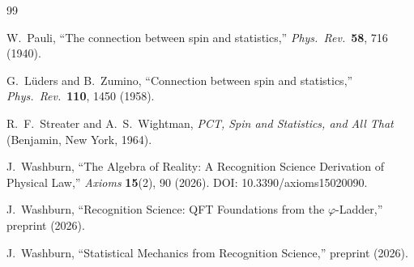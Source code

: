 \documentclass[12pt,a4paper]{article}
\theoremstyle{definition}
\theoremstyle{remark}
\begin{document}
\begin{thebibliography}{99}

W.~Pauli, ``The connection between spin and statistics,''
\textit{Phys.\ Rev.}\ \textbf{58}, 716 (1940).

G.~L\"{u}ders and B.~Zumino, ``Connection between spin and statistics,''
\textit{Phys.\ Rev.}\ \textbf{110}, 1450 (1958).

R.~F.~Streater and A.~S.~Wightman, \textit{PCT, Spin and Statistics,
and All That} (Benjamin, New York, 1964).

J.~Washburn, ``The Algebra of Reality: A Recognition Science Derivation
of Physical Law,'' \textit{Axioms} \textbf{15}(2), 90 (2026).
DOI: 10.3390/axioms15020090.

J.~Washburn, ``Recognition Science: QFT Foundations from the
$\varphi$-Ladder,'' preprint (2026).

J.~Washburn, ``Statistical Mechanics from Recognition Science,''
preprint (2026).

\end{thebibliography}
\end{document}
